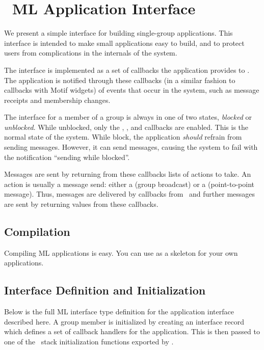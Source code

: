 \section{\ensemble\ ML Application Interface}
\label{section:applintf}

We present a simple interface for building single-group applications.  This
interface is intended to make small applications easy to build, and to protect
users from complications in the internals of the system.

The interface is implemented as a set of callbacks the application
provides to \ensemble.  The application is notified through these
callbacks (in a similar fashion to callbacks with Motif widgets) of
events that occur in the system, such as message receipts and
membership changes.

The interface for a member of a group is always in one of two states,
\emph{blocked} or \emph{unblocked}.  While unblocked, only the
, , and 
callbacks are enabled.  This is the normal state of the system. While
block, the application \emph{should} refrain from sending messages. However,
it can send messages, causing the system to fail with the notification
``sending while blocked''.

Messages are sent by returning from these callbacks lists of actions to
take.  An action is usually a message send: either a  (group
broadcast) or a  (point-to-point message).  Thus, messages are
delivered by callbacks from \ensemble\ and further messages are sent by
returning values from these callbacks.

\subsection{Compilation}
Compiling ML applications is easy.  You can use  as a
skeleton for your own applications.

\subsection{Interface Definition and Initialization}
Below is the full ML interface type definition for the application
interface described here.  A group member is initialized by creating
an interface record which defines a set of callback handlers for the
application.  This is then passed to one of the \ensemble\ stack
initialization functions exported by .

